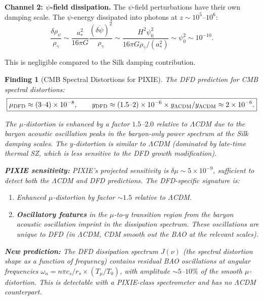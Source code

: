 \documentclass[11pt]{article}
\newtheorem{finding}{Finding}
\newcommand{\ee}[1]{\times 10^{#1}}
\begin{document}
\textbf{Channel 2: $\psi$-field dissipation.} The $\psi$-field perturbations have their own damping scale. The $\psi$-energy dissipated into photons at $z \sim 10^5$--$10^6$:
\begin{equation}
\frac{\delta\rho_\psi}{\rho_\gamma} \sim \frac{a_*^2}{16\pi G}\frac{(\delta\dot\psi)^2}{\rho_\gamma} \sim \frac{H^2\psi_0^2}{16\pi G\rho_\gamma/(a_*^2)} \sim \psi_0^2 \sim 10^{-10}.
\end{equation}

This is negligible compared to the Silk damping contribution.

\begin{finding}[CMB Spectral Distortions for PIXIE]
The DFD prediction for CMB spectral distortions:
\begin{equation}\label{eq:pixie}
\boxed{\mu_{\rm DFD} \approx (3\text{--}4) \times 10^{-8}, \qquad y_{\rm DFD} \approx (1.5\text{--}2) \times 10^{-6} \times y_{\Lambda\rm CDM}/y_{\Lambda\rm CDM} \approx 2\ee{-6}.}
\end{equation}

The $\mu$-distortion is enhanced by a factor $1.5$--$2.0$ relative to $\Lambda$CDM due to the baryon acoustic oscillation peaks in the baryon-only power spectrum at the Silk damping scales. The $y$-distortion is similar to $\Lambda$CDM (dominated by late-time thermal SZ, which is less sensitive to the DFD growth modification).

\textbf{PIXIE sensitivity:} PIXIE's projected sensitivity is $\delta\mu \sim 5\ee{-9}$, sufficient to detect both the $\Lambda$CDM and DFD predictions. The DFD-specific signature is:
\begin{enumerate}
\item Enhanced $\mu$-distortion by factor $\sim 1.5$ relative to $\Lambda$CDM.
\item \textbf{Oscillatory features} in the $\mu$-to-$y$ transition region from the baryon acoustic oscillation imprint in the dissipation spectrum. These oscillations are unique to DFD (in $\Lambda$CDM, CDM smooth out the BAO at the relevant scales).
\end{enumerate}

\textbf{New prediction:} The DFD dissipation spectrum $J(\nu)$ (the spectral distortion shape as a function of frequency) contains residual BAO oscillations at angular frequencies $\omega_n = n\pi c_s / r_s \times (T_\mu/T_0)$, with amplitude $\sim 5$--$10\%$ of the smooth $\mu$-distortion. This is detectable with a PIXIE-class spectrometer and has no $\Lambda$CDM counterpart.
\end{finding}
\end{document}
